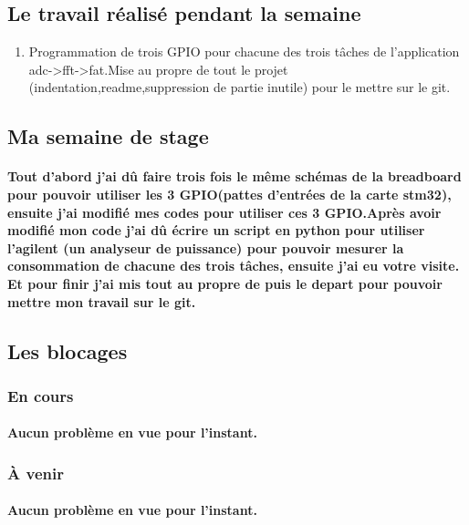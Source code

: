 \documentclass[a4paper]{article}
\begin{document}
 \subsection{Le travail réalisé pendant la semaine}
 \begin{enumerate}
\item {Programmation de trois GPIO pour chacune des trois tâches de l'application adc->fft->fat.Mise au propre de tout le projet (indentation,readme,suppression de partie inutile) pour le mettre sur le git.}
\end{enumerate}

\subsection{Ma semaine de stage}
    \paragraph{Tout d'abord j'ai dû faire trois fois le même schémas de la breadboard pour pouvoir utiliser les 3 GPIO(pattes d'entrées de la carte stm32), ensuite j'ai modifié mes codes pour utiliser ces 3 GPIO.Après avoir modifié mon code j'ai dû écrire un script en python pour utiliser l'agilent (un analyseur de puissance) pour pouvoir mesurer la consommation de chacune des trois tâches, ensuite j'ai eu votre visite. Et pour finir j'ai mis tout au propre de puis le depart pour pouvoir mettre mon travail sur le git.}
    
    \subsection{Les blocages}
\subsubsection{En cours}
    \paragraph{Aucun problème en vue pour l'instant.}
\subsubsection{À venir}
    \paragraph{Aucun problème en vue pour l'instant.}
	\paragraph{}
\end{document}
